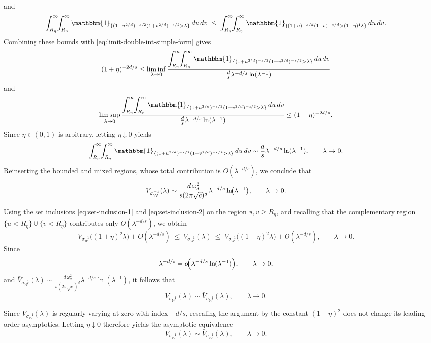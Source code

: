 \documentclass[a4paper,12pt]{article}
\let\originalleft\left
\let\originalright\right
\renewcommand{\left}{\mathopen{}\mathclose\bgroup\originalleft}
\renewcommand{\right}{\aftergroup\egroup\originalright}
\newcommand{\symbolnotsobw}{\symbolnot_{\mathcal{W}}}
\newcommand{\symbolnot}{\sigma}
\begin{document}
and
\[
\int_{R_\eta}^{\infty}\!\!\int_{R_\eta}^{\infty}
\mathbbm{1}_{\{(1+u^{2/d})^{-s/2}(1+v^{2/d})^{-s/2}>\lambda\}}
\,du\,dv
\;\le\;
\int_{R_\eta}^{\infty}\!\!\int_{R_\eta}^{\infty}
\mathbbm{1}_{\{(1+u)^{-s/d}(1+v)^{-s/d}>(1-\eta)^2\lambda\}}
\,du\,dv .
\]
Combining these bounds with \eqref{eq:limit-double-int-simple-form} gives
\[
(1+\eta)^{-2d/s}
\le
\liminf_{\lambda\to0}
\frac{
\displaystyle
\int_{R_\eta}^{\infty}\!\!\int_{R_\eta}^{\infty}
\mathbbm{1}_{\{(1+u^{2/d})^{-s/2}(1+v^{2/d})^{-s/2}>\lambda\}}
\,du\,dv
}{
\frac{d}{s}\lambda^{-d/s}\ln(\lambda^{-1})
}
\]
and
\[
\limsup_{\lambda\to0}
\frac{
\displaystyle
\int_{R_\eta}^{\infty}\!\!\int_{R_\eta}^{\infty}
\mathbbm{1}_{\{(1+u^{2/d})^{-s/2}(1+v^{2/d})^{-s/2}>\lambda\}}
\,du\,dv
}{
\frac{d}{s}\lambda^{-d/s}\ln(\lambda^{-1})
}
\le
(1-\eta)^{-2d/s}.
\]
Since $\eta\in(0,1)$ is arbitrary, letting $\eta\downarrow0$ yields
\begin{equation}\label{eq:limit-double-int-simple-form-2}
\int_{R_\eta}^{\infty}\!\!\int_{R_\eta}^{\infty}
\mathbbm{1}_{\{(1+u^{2/d})^{-s/2}(1+v^{2/d})^{-s/2}>\lambda\}}
\,du\,dv
\sim
\frac{d}{s}\lambda^{-d/s}\ln(\lambda^{-1}),
\qquad \lambda\to0.
\end{equation}
Reinserting the bounded and mixed regions, whose total contribution is
$O(\lambda^{-d/s})$, we conclude that
\begin{equation}\label{eq:asymp-vol-case-r-equals-s}
V_{\symbolnotsobw^{-1}}(\lambda)
\sim
\frac{d\,\omega_d^2}{s(2\pi\sqrt{c})^{d}}
\lambda^{-d/s}\ln\!\left(\lambda^{-1}\right),
\qquad \lambda\to0.
\end{equation}



Using the set inclusions \eqref{eq:set-inclusion-1} and
\eqref{eq:set-inclusion-2} on the region $u,v\ge R_\eta$, and recalling that
the complementary region $\{u<R_\eta\}\cup\{v<R_\eta\}$ contributes only
$O(\lambda^{-d/s})$, we obtain
\[
\bar V_{\symbolnotsobw^{-1}}\!\bigl((1+\eta)^2\lambda\bigr)
+ O(\lambda^{-d/s})
\;\le\;
V_{\symbolnotsobw^{-1}}(\lambda)
\;\le\;
\bar V_{\symbolnotsobw^{-1}}\!\bigl((1-\eta)^2\lambda\bigr)
+ O(\lambda^{-d/s}),
\qquad \lambda\to0 .
\]
Since
\[
\lambda^{-d/s}
=
o\!\left(\lambda^{-d/s}\ln(\lambda^{-1})\right),
\qquad \lambda\to0,
\]
and $\bar V_{\symbolnotsobw^{-1}}(\lambda)\sim
\frac{d\,\omega_d^2}{s(2\pi\sqrt{c})^d}\lambda^{-d/s}\ln(\lambda^{-1})$,
it follows that
\[
V_{\symbolnotsobw^{-1}}(\lambda)
\sim
\bar V_{\symbolnotsobw^{-1}}(\lambda),
\qquad \lambda\to0.
\]


Since $\bar V_{\symbolnotsobw^{-1}}(\lambda)$ is regularly varying at
zero with index $-d/s$, rescaling the argument by the constant
$(1\pm\eta)^2$ does not change its leading-order asymptotics.
Letting $\eta\downarrow0$ therefore yields the asymptotic equivalence
\[
V_{\symbolnotsobw^{-1}}(\lambda)
\sim
\bar V_{\symbolnotsobw^{-1}}(\lambda),
\qquad \lambda\to0 .
\]
\end{document}
